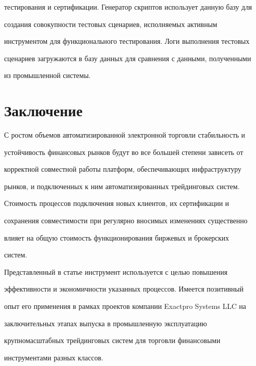 тестирования и сертификации. Генератор скриптов использует данную базу для


создания совокупности тестовых сценариев, исполняемых активным


инструментом для функционального тестирования. Логи выполнения тестовых


сценариев загружаются в базу данных для сравнения с данными, полученными


из промышленной системы.





\vspace*{-6pt}





\section{Заключение}





С ростом объемов автоматизированной электронной торговли стабильность и


устойчивость финансовых рынков будут во все большей степени зависеть от


корректной совместной работы платформ, обеспечивающих инфраструктуру


рынков, и подключенных к ним автоматизированных трейдинговых систем.


Стоимость процессов подключения новых клиентов, их сертификации и


сохранения со\-вмес\-ти\-мости при регулярно вносимых изменениях существенно


влияет на общую стоимость функционирования биржевых и брокерских


систем.





Представленный в статье инструмент используется с целью повышения


эффективности и экономичности указанных процессов. Имеется позитивный


опыт его применения в рамках проектов компании Exactpro Systems LLC на


заключительных этапах выпуска в промышленную эксплуатацию


крупномасштабных трейдинговых систем для торговли финансовыми


инструментами разных \mbox{классов}.



